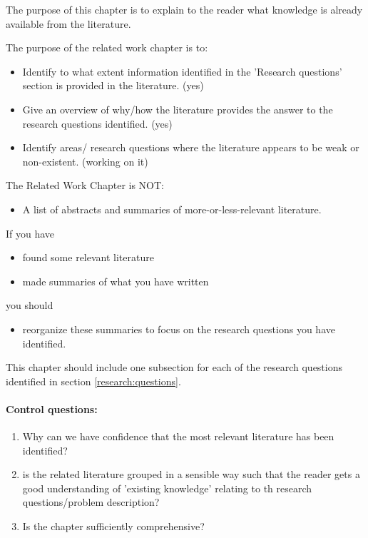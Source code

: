 The purpose of this chapter
is to explain to the reader what knowledge is already
available from the literature.

The purpose of the related work chapter is to:
\begin{itemize}
\item Identify to what extent information identified in the 'Research questions'  section is provided in the literature. (yes)
\item Give an overview of why/how the literature provides the answer to the research questions identified. (yes)
\item Identify areas/ research questions where the literature appears to be weak or non-existent. (working on it)
\end{itemize}
The Related Work Chapter is NOT:
\begin{itemize}
\item   A list of abstracts and summaries of more-or-less-relevant literature.
\end{itemize}
If you have
\begin{itemize}
\item   found some relevant literature
\item   made summaries of what you have written
\end{itemize}
you should
\begin{itemize}
\item reorganize these summaries to focus on the research questions you have identified.
\end{itemize}

This chapter should include one subsection for each of the research
questions identified in section \ref{research:questions}.  

\paragraph{Control questions:}
\begin{enumerate}
\item Why can we have confidence that the most relevant literature has been identified?
\item is the related literature grouped in a sensible way such that the reader gets a good understanding of 'existing knowledge' relating to th research questions/problem description?
\item Is the chapter sufficiently comprehensive?
\end{enumerate}
\fi